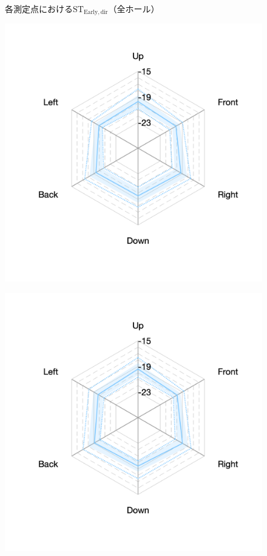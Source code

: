 \documentclass[11pt,a4j]{jreport}
\begin{document}
\begin{figure}[H]
    \caption{各測定点における$\mathrm{ST_{Early,dir}}$（全ホール）}
    \label{fig:各測定点におけるSTEarly}
    \end{figure}


    \begin{figure}[H]
      \begin{minipage}[b]{.33\textwidth}
          \centering
          \includegraphics[width=1\linewidth]{images/realHallDirSt/late_S03_allhall.png}
          \label{fig:S03late}
      \end{minipage}%
      \begin{minipage}[b]{.33\textwidth}
        \centering
        \includegraphics[width=1\linewidth]{images/realHallDirSt/late_S02_allhall.png}

\end{minipage}
\end{figure}
\end{document}
